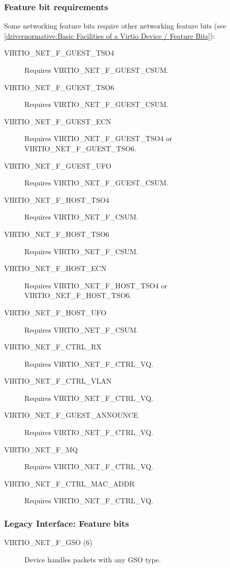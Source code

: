 \subsubsection{Feature bit requirements}\label{sec:Device Types / Network Device / Feature bits / Feature bit requirements}

Some networking feature bits require other networking feature bits
(see \ref{drivernormative:Basic Facilities of a Virtio Device / Feature Bits}):

\begin{description}
\item[VIRTIO_NET_F_GUEST_TSO4] Requires VIRTIO_NET_F_GUEST_CSUM.
\item[VIRTIO_NET_F_GUEST_TSO6] Requires VIRTIO_NET_F_GUEST_CSUM.
\item[VIRTIO_NET_F_GUEST_ECN] Requires VIRTIO_NET_F_GUEST_TSO4 or VIRTIO_NET_F_GUEST_TSO6.
\item[VIRTIO_NET_F_GUEST_UFO] Requires VIRTIO_NET_F_GUEST_CSUM.

\item[VIRTIO_NET_F_HOST_TSO4] Requires VIRTIO_NET_F_CSUM.
\item[VIRTIO_NET_F_HOST_TSO6] Requires VIRTIO_NET_F_CSUM.
\item[VIRTIO_NET_F_HOST_ECN] Requires VIRTIO_NET_F_HOST_TSO4 or VIRTIO_NET_F_HOST_TSO6.
\item[VIRTIO_NET_F_HOST_UFO] Requires VIRTIO_NET_F_CSUM.

\item[VIRTIO_NET_F_CTRL_RX] Requires VIRTIO_NET_F_CTRL_VQ.
\item[VIRTIO_NET_F_CTRL_VLAN] Requires VIRTIO_NET_F_CTRL_VQ.
\item[VIRTIO_NET_F_GUEST_ANNOUNCE] Requires VIRTIO_NET_F_CTRL_VQ.
\item[VIRTIO_NET_F_MQ] Requires VIRTIO_NET_F_CTRL_VQ.
\item[VIRTIO_NET_F_CTRL_MAC_ADDR] Requires VIRTIO_NET_F_CTRL_VQ.
\end{description}

\subsubsection{Legacy Interface: Feature bits}\label{sec:Device Types / Network Device / Feature bits / Legacy Interface: Feature bits}
\begin{description}
\item[VIRTIO_NET_F_GSO (6)] Device handles packets with any GSO type.
\end{description}


